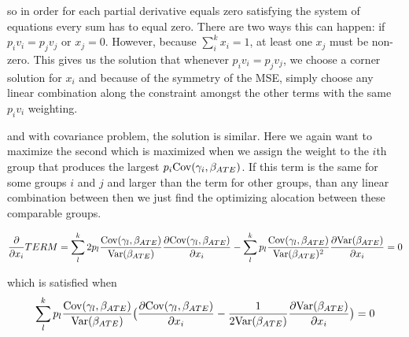 so in order for each partial derivative equals zero satisfying the system of equations every sum has to equal zero.
There are two ways this can happen: if $p_i v_i = p_j v_j$ or $x_j = 0$.
However, because $\sum_{i}^{k} x_i = 1$, at least one $x_j$  must be non-zero. This gives us the solution that whenever $p_i v_i = p_j v_j$, we choose a corner solution for $x_{i}$ and because of the symmetry of the MSE, simply choose any linear combination along the constraint amongst the other terms with the same $p_i v_{i}$ weighting.


and with covariance problem, the solution is similar. Here we again want to maximize the second which is maximized when we assign the weight to the $i$th group that produces the largest $p_i \mathrm{Cov}(\gamma_i, \beta_{ATE})$. If this term is the same for some groups $i$ and $j$ and larger than the term for other groups, than any linear combination between then we just find the optimizing alocation between these comparable groups.


\begin{align*}
	\frac{\partial}{\partial x_i} TERM &= \sum_{l}^{k}2 p_{l} \frac{\mathrm{Cov}(\gamma_l, \beta_{ATE}) }{\mathrm{Var}(\beta_{ATE})}\frac{\partial \mathrm{Cov}(\gamma_l, \beta_{ATE})}{\partial x_{i}} - \sum_{l}^{k} p_l\frac{\mathrm{Cov}(\gamma_l, \beta_{ATE})}{\mathrm{Var}(\beta_{ATE})^2} \frac{\partial \mathrm{Var}(\beta_{ATE})}{\partial x_i}= 0 \\ 
\end{align*} 

which is satisfied when
\begin{align*}
	 \sum_{l}^{k} p_{l}\frac{\mathrm{Cov}(\gamma_l, \beta_{ATE}) }{\mathrm{Var}(\beta_{ATE})}  \big( \frac{\partial \mathrm{Cov}(\gamma_l, \beta_{ATE})}{\partial x_{i}} - \frac{1}{2\mathrm{Var}(\beta_{ATE})} \frac{\partial \mathrm{Var}(\beta_{ATE})}{\partial x_i} \big) = 0 \\ 
\end{align*} 






